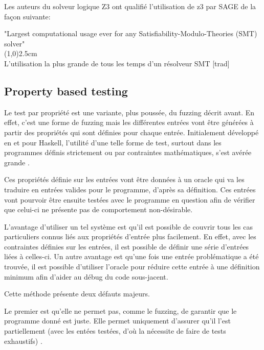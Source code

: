 \documentclass[a4paper]{report}
\begin{document}
Les auteurs du solveur logique Z3 ont qualifié l'utilisation de z3 par SAGE de la façon suivante:
\begin{center}
"Largest computational usage ever for any Satisfiability-Modulo-Theories (SMT) solver" \cite{moura2008z3}\\
\line(1,0){2.5cm}$ $ \\
L'utilisation la plus grande de tous les temps d'un résolveur SMT [trad] 
\end{center}

\subsection{Property based testing}

Le test par propriété est une variante, plus poussée, du fuzzing décrit avant.
En effet, c'est une forme de fuzzing mais les différentes entrées vont être générées à partir des propriétés qui sont définies pour chaque entrée.
Initialement développé en et pour Haskell, l'utilité d'une telle forme de test, surtout dans les programmes définis strictement ou par contraintes mathématiques, s'est avérée grande \cite{Paraskevopoulou2015}.

Ces propriétés définie sur les entrées vont être données à un oracle qui va les traduire en entrées valides pour le programme, d'après sa définition.
Ces entrées vont pourvoir être ensuite testées avec le programme en question afin de vérifier que celui-ci ne présente pas de comportement non-désirable\cite{Fink1997}.

L'avantage d'utiliser un tel système est qu'il est possible de couvrir tous les cas particuliers connus liés aux propriétés d'entrée plus facilement.
En effet, avec les contraintes définies sur les entrées, il est possible de définir une série d'entrées liées à celles-ci.
Un autre avantage est qu'une fois une entrée problématique a été trouvée, il est possible d'utiliser l'oracle pour réduire cette entrée à une définition minimum afin d'aider au débug du code sous-jacent\cite{Papadakis2011}.

Cette méthode présente deux défauts majeurs.

Le premier est qu'elle ne permet pas, comme le fuzzing, de garantir que le programme donné est juste.
Elle permet uniquement d'assurer qu'il l'est partiellement (avec les entées testées, d'où la nécessite de faire de tests exhaustifs) \cite{Papadakis2011}.
\end{document}
